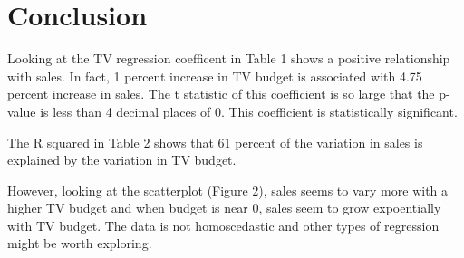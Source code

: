 \documentclass{article}
\begin{document}
\section{Conclusion}

Looking at the TV regression coefficent in Table 1 shows a positive relationship with sales. In fact, 1 percent increase in TV budget is associated with 4.75 percent increase in sales. The t statistic of this coefficient is so large that the p-value is less than 4 decimal places of 0. This coefficient is statistically significant.  

The R squared in Table 2 shows that 61 percent of the variation in sales is explained by the variation in TV budget.   

However, looking at the scatterplot (Figure 2), sales seems to vary more with a higher TV budget and when budget is near 0, sales seem to grow expoentially with TV budget. The data is not homoscedastic and other types of regression might be worth exploring.   
\end{document}
